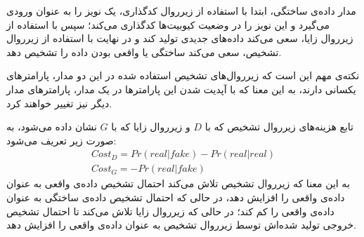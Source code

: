 مدار داده‌ی ساختگی، ابتدا با استفاده از زیرروال کدگذاری، یک نویز را به عنوان ورودی می‌گیرد و این نویز را  در وضعیت کیوبیت‌ها کدگذاری می‌کند؛ سپس با استفاده از زیرروال زایا، سعی می‌کند داده‌های جدیدی تولید کند و در نهایت با استفاده از زیرروال تشخیص، سعی می‌کند ساختگی یا واقعی بودن داده را تشخیص دهد.

نکته‌ی مهم این است که زیرروال‌های تشخیص استفاده شده در این دو مدار، پارامترهای یکسانی دارند، به این معنا که با آپدیت شدن این پارامترها در یک مدار، پارامترهای مدار دیگر نیز تغییر خواهند کرد.

تابع هزینه‌های زیرروال تشخیص که با 
$D$
و زیرروال زایا که با
$G$
نشان داده می‌شود، به صورت زیر تعریف می‌شود:
\begin{equation} \label{eqn:qugan_cost}
    \begin{gathered}
        Cost_D = Pr(real|fake) - Pr(real|real)  \\
        Cost_G = -Pr(real|fake)
    \end{gathered}
\end{equation}
به این معنا که زیرروال تشخیص تلاش می‌کند احتمال تشخیص داده‌ی واقعی به عنوان داده‌ی واقعی را افزایش دهد، در حالی که احتمال تشخیص داده‌ی ساختگی به عنوان داده‌ی واقعی را کم کند؛ در حالی که زیرروال زایا تلاش می‌کند تا احتمال تشخیص خروجی تولید شده‌اش توسط زیرروال تشخیص به عنوان داده‌ی واقعی را افزایش دهد.



